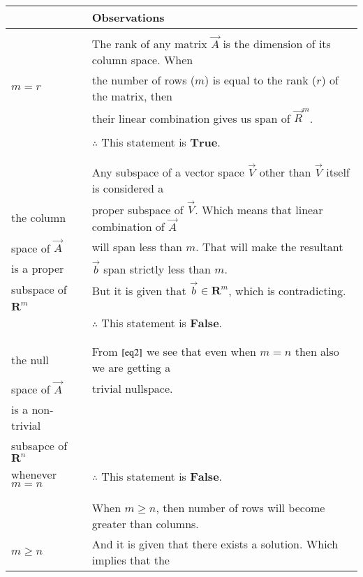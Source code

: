 \documentclass[journal,12pt,twocolumn]{IEEEtran}
\begin{document}
\begin{table}[hp]
\begin{tabular}{|l|l|}
\begin{document}
				\begin{table}[hp]
					\begin{tabular}{|l|l|}
						\hline
						Options & Observations\\
						\hline
						& \\
						& The rank of any matrix $\vec{A}$ is the dimension of its column space. When  \\
						$m = r$&  the number of rows ($m$) is equal to the rank ($r$) of the matrix, then \\
						&  their linear combination gives us span of $\vec{R}^{m}$.\\
						& \\
						& $\therefore$ This statement is $\textbf{True}$. \\
						& \\
						\hline 
						& \\
						& Any subspace of a vector space $\vec{V}$ other than $\vec{V}$ itself is considered a \\
						the column & proper subspace of $\vec{V}$. Which means that linear combination of $\vec{A}$\\
						space of $\vec{A}$ & will span less than $m$. That will make the resultant\\
						is a proper & $\vec{b}$ span strictly less than $m$.\\ 
						subspace of & But it is given that $\vec{b} \in \mathbf{R}^{m}$, which is contradicting.\\  
						$\mathbf{R}^{m}$ & \\
						& $\therefore$ This statement is $\textbf{False}$. \\
						& \\
						\hline
						& \\
						the null & From $\eqref{eq2}$ we see that even when $m = n$ then also we are getting a\\ 
						space of $\vec{A}$ & trivial nullspace. \\
						is a non-trivial& \\
						subsapce of $\mathbf{R}^{n}$& \\
						whenever $m=n$& $\therefore$ This statement is $\textbf{False}$. \\
						& \\
						\hline
						& \\
						& When $m \geq n$, then number of rows will become greater than columns.\\
						$m \geq n$ & And it is given that there exists a solution. Which implies that the \\

\end{tabular}
\end{table}
\end{document}
\end{tabular}
\end{table}
\end{document}

